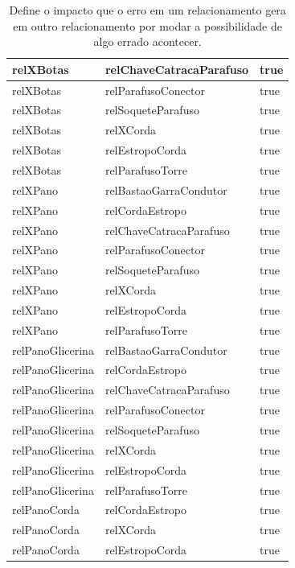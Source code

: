 \documentclass[12pt]{article}
\begin{document}
\begin{table}[H]
\begin{tabular}{|l|l|l|}
relXBotas & relChaveCatracaParafuso & true \\ \hline
relXBotas & relParafusoConector & true \\ \hline
relXBotas & relSoqueteParafuso & true \\ \hline
relXBotas & relXCorda & true \\ \hline
relXBotas & relEstropoCorda & true \\ \hline
relXBotas & relParafusoTorre & true \\ \hline
relXPano & relBastaoGarraCondutor & true \\ \hline
relXPano & relCordaEstropo & true \\ \hline
relXPano & relChaveCatracaParafuso & true \\ \hline
relXPano & relParafusoConector & true \\ \hline
relXPano & relSoqueteParafuso & true \\ \hline
relXPano & relXCorda & true \\ \hline
relXPano & relEstropoCorda & true \\ \hline
relXPano & relParafusoTorre & true \\ \hline
relPanoGlicerina & relBastaoGarraCondutor & true \\ \hline
relPanoGlicerina & relCordaEstropo & true \\ \hline
relPanoGlicerina & relChaveCatracaParafuso & true \\ \hline
relPanoGlicerina & relParafusoConector & true \\ \hline
relPanoGlicerina & relSoqueteParafuso & true \\ \hline
relPanoGlicerina & relXCorda & true \\ \hline
relPanoGlicerina & relEstropoCorda & true \\ \hline
relPanoGlicerina & relParafusoTorre & true \\ \hline
relPanoCorda & relCordaEstropo & true \\ \hline
relPanoCorda & relXCorda & true \\ \hline
relPanoCorda & relEstropoCorda & true \\ \hline
\end{tabular}
\caption{Define o impacto que o erro em um relacionamento gera em outro relacionamento por modar a possibilidade de algo errado acontecer.}
\label{relation1}
\end{table}
\end{document}
